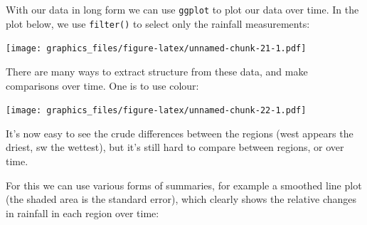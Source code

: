 \documentclass[]{article}
\newenvironment{Shaded}{\begin{snugshade}}{\end{snugshade}}
\newcommand{\KeywordTok}[1]{\textcolor[rgb]{0.13,0.29,0.53}{\textbf{#1}}}
\newcommand{\DataTypeTok}[1]{\textcolor[rgb]{0.13,0.29,0.53}{#1}}
\newcommand{\StringTok}[1]{\textcolor[rgb]{0.31,0.60,0.02}{#1}}
\newcommand{\OperatorTok}[1]{\textcolor[rgb]{0.81,0.36,0.00}{\textbf{#1}}}
\newcommand{\NormalTok}[1]{#1}
\theoremstyle{definition}
\theoremstyle{definition}
\theoremstyle{definition}
\theoremstyle{remark}
\begin{document}
With our data in long form we can use \texttt{ggplot} to plot our data
over time. In the plot below, we use \texttt{filter()} to select only
the rainfall measurements:

\begin{Shaded}
\end{Shaded}

\texttt{[image: graphics\_files/figure-latex/unnamed-chunk-21-1.pdf]}

There are many ways to extract structure from these data, and make
comparisons over time. One is to use colour:

\begin{Shaded}
\end{Shaded}

\texttt{[image: graphics\_files/figure-latex/unnamed-chunk-22-1.pdf]}

It's now easy to see the crude differences between the regions (west
appears the driest, sw the wettest), but it's still hard to compare
between regions, or over time.

For this we can use various forms of summaries, for example a smoothed
line plot (the shaded area is the standard error), which clearly shows
the relative changes in rainfall in each region over time:

\begin{Shaded}
\end{Shaded}
\end{document}
